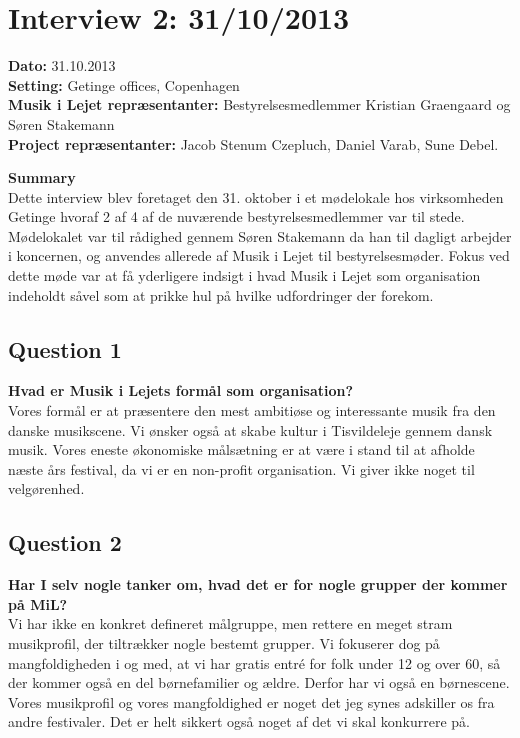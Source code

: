 \section{Interview 2: 31/10/2013}
\label{interview_2}

\textbf{Dato:} 31.10.2013 \\
\textbf{Setting:} Getinge offices, Copenhagen \\
\textbf{Musik i Lejet repræsentanter:} Bestyrelsesmedlemmer Kristian Graengaard og Søren Stakemann \\
\textbf{Project repræsentanter:} Jacob Stenum Czepluch, Daniel Varab, Sune Debel.

\bigskip

\noindent \textbf{Summary} \\
Dette interview blev foretaget den 31. oktober i et mødelokale hos virksomheden Getinge hvoraf 2 af 4 af de nuværende bestyrelsesmedlemmer var til stede. Mødelokalet var til rådighed gennem Søren Stakemann da han til dagligt arbejder i koncernen, og anvendes allerede af Musik i Lejet til bestyrelsesmøder. Fokus ved dette møde var at få yderligere indsigt i hvad Musik i Lejet som organisation indeholdt såvel som at prikke hul på hvilke udfordringer der forekom.


\subsection{Question 1}
\label{i2q1}
\noindent \textbf{Hvad er Musik i Lejets formål som organisation?} \\
Vores formål er at præsentere den mest ambitiøse og interessante musik fra den danske musikscene. Vi ønsker også at skabe kultur i Tisvildeleje gennem dansk musik. Vores eneste økonomiske målsætning er at være i stand til at afholde næste års festival, da vi er en non-profit organisation. Vi giver ikke noget til velgørenhed. 

\subsection{Question 2}
\label{i2q2}
\noindent \textbf{Har I selv nogle tanker om, hvad det er for nogle grupper der kommer på MiL?} \\
Vi har ikke en konkret defineret målgruppe, men rettere en  meget stram musikprofil, der tiltrækker nogle bestemt grupper. Vi fokuserer dog på mangfoldigheden i og med, at vi har gratis entré for folk under 12 og over 60, så der kommer også en del børnefamilier og ældre. Derfor har vi også en børnescene. Vores musikprofil og vores mangfoldighed er noget det jeg synes adskiller os fra andre festivaler. Det er helt sikkert også noget af det vi skal konkurrere på.

